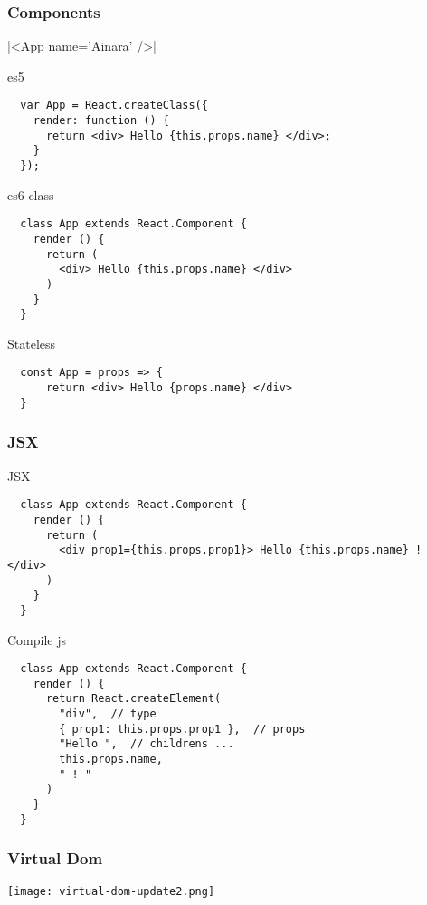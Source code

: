 \begin{frame}[fragile]

  \frametitle{Components}
  |<App name='Ainara' />|

  es5
  \begin{verbatim}
  var App = React.createClass({
    render: function () {
      return <div> Hello {this.props.name} </div>;
    }
  });
  \end{verbatim}

  es6 class
  \begin{verbatim}
  class App extends React.Component {
    render () {
      return (
        <div> Hello {this.props.name} </div>
      )
    }
  }
  \end{verbatim}

  Stateless
  \begin{verbatim}
  const App = props => {
      return <div> Hello {props.name} </div>
  }
  \end{verbatim}

\end{frame}


\begin{frame}[fragile]

  \frametitle{JSX}

  JSX
  \begin{verbatim}
  class App extends React.Component {
    render () {
      return (
        <div prop1={this.props.prop1}> Hello {this.props.name} ! </div>
      )
    }
  }
  \end{verbatim}


  Compile js
  \begin{verbatim}
  class App extends React.Component {
    render () {
      return React.createElement(
        "div",  // type
        { prop1: this.props.prop1 },  // props
        "Hello ",  // childrens ...
        this.props.name,
        " ! "  
      )
    }
  }
  \end{verbatim}

\end{frame}

\begin{frame}

  \frametitle{Virtual Dom}

  \texttt{[image: virtual-dom-update2.png]}

\end{frame}

